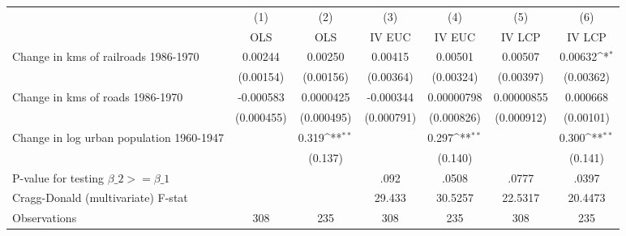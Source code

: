 {
\def\sym#1{\ifmmode^{#1}\else\(^{#1}\)\fi}
\begin{tabular}{l*{6}{c}}
\hline\hline
                &\multicolumn{1}{c}{(1)}&\multicolumn{1}{c}{(2)}&\multicolumn{1}{c}{(3)}&\multicolumn{1}{c}{(4)}&\multicolumn{1}{c}{(5)}&\multicolumn{1}{c}{(6)}\\
                &\multicolumn{1}{c}{OLS}&\multicolumn{1}{c}{OLS}&\multicolumn{1}{c}{IV EUC}&\multicolumn{1}{c}{IV EUC}&\multicolumn{1}{c}{IV LCP}&\multicolumn{1}{c}{IV LCP}\\
\hline
Change in kms of railroads 1986-1970&  0.00244         &  0.00250         &  0.00415         &  0.00501         &  0.00507         &  0.00632\sym{*}  \\
                &(0.00154)         &(0.00156)         &(0.00364)         &(0.00324)         &(0.00397)         &(0.00362)         \\
[1em]
Change in kms of roads 1986-1970&-0.000583         &0.0000425         &-0.000344         &0.00000798         &0.00000855         & 0.000668         \\
                &(0.000455)         &(0.000495)         &(0.000791)         &(0.000826)         &(0.000912)         &(0.00101)         \\
[1em]
Change in log urban population 1960-1947&                  &    0.319\sym{**} &                  &    0.297\sym{**} &                  &    0.300\sym{**} \\
                &                  &  (0.137)         &                  &  (0.140)         &                  &  (0.141)         \\
\hline
P-value for testing $\beta\_{2} >= \beta\_{1}$&                  &                  &     .092         &    .0508         &    .0777         &    .0397         \\
Cragg-Donald (multivariate) F-stat&                  &                  &   29.433         &  30.5257         &  22.5317         &  20.4473         \\
Observations    &      308         &      235         &      308         &      235         &      308         &      235         \\
\hline\hline
\end{tabular}
}
